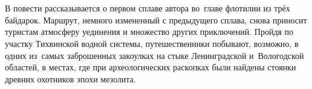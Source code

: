 \chapter*{}

В повести рассказывается о первом сплаве автора во~главе флотилии из трёх байдарок. Маршрут, немного измененный с предыдущего сплава, снова приносит туристам атмосферу уединения и множество других приключений. Пройдя по участку Тихвинской водной системы, путешественники побывают, возможно, в одних из~самых заброшенных закоулках на стыке Ленинградской и~Вологодской областей, в местах, где при археологических раскопках были найдены стоянки древних охотников эпохи мезолита.

